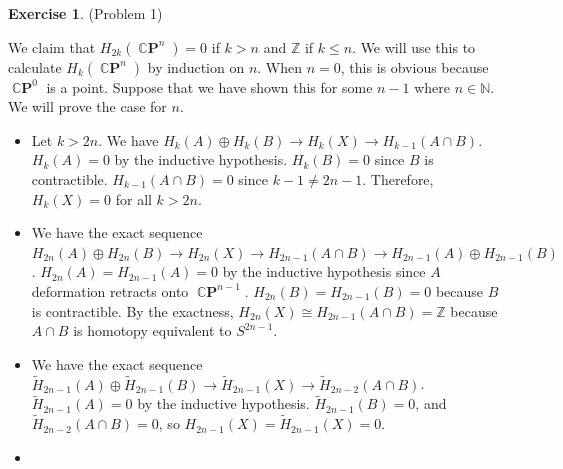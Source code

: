 \documentclass[psamsfonts]{amsart}
\theoremstyle{definition}
\newtheorem*{exer}{Exercise}
\theoremstyle{remark}
\DeclareMathOperator{\CP}{\mathbb{C}\mathbf{P}}
\numberwithin{equation}{section}
\begin{document}
\begin{exer}{(Problem 1)}
\begin{itemize}
       We claim that $H_{2k}(\CP^n) = 0$ if $k > n$ and $\mathbb{Z}$ if $k \leq n$.
       We will use this to calculate $H_k(\CP^n)$ by induction on $n$.
       When $n = 0$, this is obvious because $\CP^0$ is a point.
       Suppose that we have shown this for some $n - 1$ where $n \in \mathbb{N}$.
       We will prove the case for $n$.
       \begin{itemize}
         \item
           Let $k > 2n$.
           We have $H_{k}(A) \oplus H_k(B) \rightarrow H_k(X) \rightarrow H_{k - 1}(A \cap B)$.
           $H_k(A) = 0$ by the inductive hypothesis.
           $H_k(B) = 0$ since $B$ is contractible.
           $H_{k - 1}(A \cap B) = 0$ since $k - 1 \ne 2n - 1$.
           Therefore, $H_k(X) = 0$ for all $k > 2n$.
         \item
           We have the exact sequence $H_{2n}(A) \oplus H_{2n}(B) \rightarrow H_{2n}(X) \rightarrow H_{2n - 1}(A \cap B) \rightarrow H_{2n - 1}(A) \oplus H_{2n - 1}(B)$.
           $H_{2n}(A) = H_{2n - 1}(A) = 0$ by the inductive hypothesis since $A$ deformation retracts onto $\CP^{n - 1}$.
           $H_{2n}(B) = H_{2n - 1}(B) = 0$ because $B$ is contractible.
           By the exactness, $H_{2n}(X) \cong H_{2n - 1}(A \cap B) = \mathbb{Z}$ because $A \cap B$ is homotopy equivalent to $S^{2n - 1}$.
         \item
           We have the exact sequence $\tilde{H}_{2n - 1}(A) \oplus \tilde{H}_{2n - 1}(B) \rightarrow \tilde{H}_{2n - 1}(X) \rightarrow \tilde{H}_{2n - 2}(A \cap B)$.
           $\tilde{H}_{2n - 1}(A) = 0$ by the inductive hypothesis.
           $\tilde{H}_{2n - 1}(B) = 0$, and $\tilde{H}_{2n - 2}(A \cap B) = 0$, so $H_{2n - 1}(X) = \tilde{H}_{2n - 1}(X) = 0$.
         \item
       \end{itemize}

  \end{itemize}
\end{exer}
\end{document}
